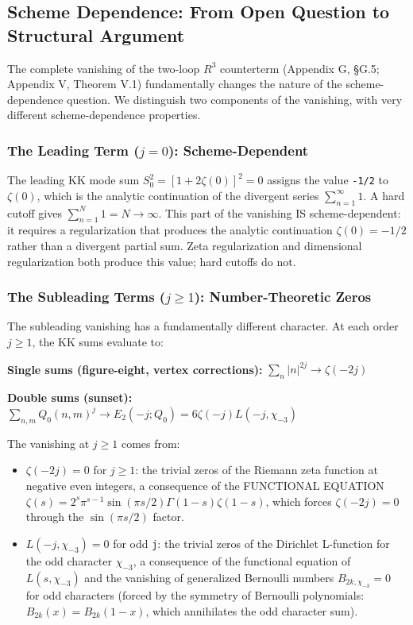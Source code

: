 \documentclass[aps,prd,preprint,superscriptaddress,longbibliography,floatfix]{revtex4-2}
\theoremstyle{remark}
\begin{document}
\subsection{Scheme Dependence: From Open Question to Structural Argument}

The complete vanishing of the two-loop $R^{3}$ counterterm (Appendix G, \S{}G.5; Appendix V, Theorem V.1) fundamentally changes the nature of the scheme- dependence question. We distinguish two components of the vanishing, with very different scheme-dependence properties.


\subsubsection{The Leading Term ($j = 0$): Scheme-Dependent}

The leading KK mode sum $S_{0}^{2} = [1 + 2\zeta(0)]^{2} = 0$ assigns the value \texttt{-1/2} to $\zeta(0)$, which is the analytic continuation of the divergent series $\sum_{n=1}^\infty 1$. A hard cutoff gives $\sum_{n=1}^N 1 = N \to \infty$. This part of the vanishing IS scheme-dependent: it requires a regularization that produces the analytic continuation $\zeta(0) = -1/2$ rather than a divergent partial sum. Zeta regularization and dimensional regularization both produce this value; hard cutoffs do not.


\subsubsection{The Subleading Terms ($j \geq 1$): Number-Theoretic Zeros}

The subleading vanishing has a fundamentally different character. At each order $j \geq 1$, the KK sums evaluate to:

\textbf{Single sums (figure-eight, vertex corrections):} $\sum_n |n|^{2j} \to \zeta(-2j)$

\textbf{Double sums (sunset):} $\sum_{n,m} Q_{0}(n,m)^j \to E_{2}(-j; Q_{0}) = 6\zeta(-j)L(-j, \chi_{-3})$

The vanishing at $j \geq 1$ comes from:

\begin{itemize}
  \item $\zeta(-2j) = 0$ for $j \geq 1$: the trivial zeros of the Riemann zeta function at negative even integers, a consequence of the FUNCTIONAL EQUATION $\zeta(s) = 2^s \pi^{s-1} \sin(\pi s/2) \Gamma(1-s) \zeta(1-s)$, which forces $\zeta(-2j) = 0$ through the $\sin(\pi s/2)$ factor.
  \item $L(-j, \chi_{-3}) = 0$ for odd \texttt{j}: the trivial zeros of the Dirichlet L-function for the odd character $\chi_{-3}$, a consequence of the functional equation of $L(s, \chi_{-3})$ and the vanishing of generalized Bernoulli numbers $B_{2k, \chi_{-3}} = 0$ for odd characters (forced by the symmetry of Bernoulli polynomials: $B_{2k}(x) = B_{2k}(1-x)$, which annihilates the odd character sum).
\end{itemize}
\end{document}
